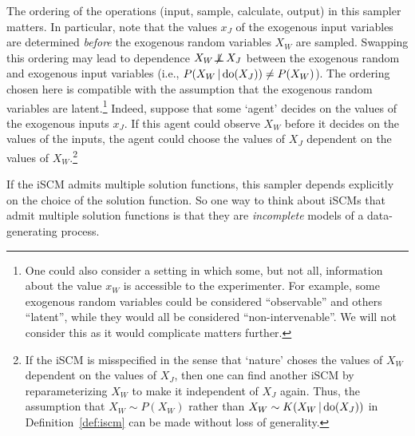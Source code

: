 The ordering of the operations (input, sample, calculate, output) in this sampler matters.
In particular, note that the values $x_J$ of the exogenous input variables are determined \emph{before} the exogenous random variables $X_W$ are sampled.
Swapping this ordering may lead to dependence $X_W \operatorname*{\not\mkern-2mu\perp\mkern-11mu\perp} X_J$ between the exogenous random and exogenous input variables (i.e., $P(X_W \operatorname*{|} \operatorname{do}(X_J)) \ne P(X_W)$).
The ordering chosen here is compatible with the assumption that the exogenous random variables are latent.\footnote{One could also consider a setting in
which some, but not all, information about the value $x_W$ is accessible to the experimenter. For example, some exogenous random variables
could be considered ``observable'' and others ``latent'', while they would all be considered ``non-intervenable''. We will not consider this as 
it would complicate matters further.}
Indeed, suppose that some `agent' decides on the values of the exogenous inputs $x_J$.
If this agent could observe $X_W$ before it decides on the values of the inputs, the agent could choose the values of $X_J$ dependent on the values of $X_W$.\footnote{If the iSCM is misspecified in the sense that `nature' choses the values of $X_W$ dependent on the values of $X_J$, then one can find another iSCM by reparameterizing $X_W$ to make it independent of $X_J$ again. Thus, the assumption that $X_W \sim P(X_W)$ rather than $X_W \sim K(X_W \operatorname*{|} \operatorname{do}(X_J))$ in Definition~\ref{def:iscm} can be made without loss of generality.}

If the iSCM admits multiple solution functions, this sampler depends explicitly on the choice of the solution function.
So one way to think about iSCMs that admit multiple solution functions is that they are \emph{incomplete} models of a data-generating process.


